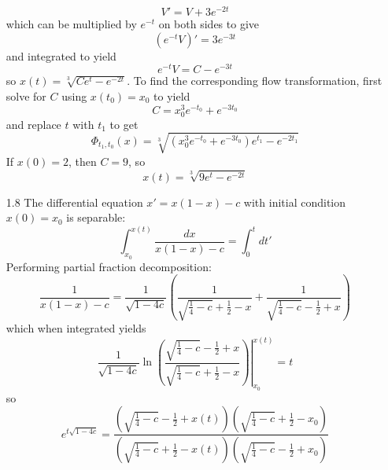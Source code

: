 \documentclass{exam}
\begin{document}
\begin{enumerate}
    \begin{equation*}
        V' = V + 3e^{-2t} 
    \end{equation*}
    which can be multiplied by $e^{-t}$ on both sides to give
    \begin{equation*}
        \left(e^{-t}V\right)' = 3e^{-3t}
    \end{equation*}
    and integrated to yield
    \begin{equation*}
        e^{-t}V = C-e^{-3t}
    \end{equation*}
    so $x(t) = \sqrt[3]{Ce^{t}-e^{-2t}}$. To find the corresponding flow transformation, first solve for $C$ using $x(t_0) = x_0$ to yield
    \begin{equation*}
        C = x_0^3e^{-t_0} + e^{-3t_0}
    \end{equation*}
    and replace $t$ with $t_1$ to get
    \begin{equation*}
        \Phi_{t_1, t_0}(x) = \sqrt[3]{\left(x_0^3e^{-t_0}+e^{-3t_0}\right)e^{t_1}-e^{-2t_1}}
    \end{equation*}
    If $x(0) = 2$, then $C = 9$, so
    \begin{equation*}
        x(t) = \sqrt[3]{9e^t-e^{-2t}}
    \end{equation*}
    \item[1.8] The differential equation $x' = x(1-x) - c$ with initial condition $x(0) = x_0$ is separable:
    \begin{equation*}
        \int_{x_0}^{x(t)}\frac{dx}{x(1-x)-c} = \int_{0}^{t}dt'
    \end{equation*}
    Performing partial fraction decomposition:
    \begin{equation*}
        \frac{1}{x(1-x)-c} = \frac{1}{\sqrt{1-4c}}\left(\frac{1}{\sqrt{\frac{1}{4}-c}+\frac{1}{2}-x}+\frac{1}{\sqrt{\frac{1}{4}-c}-\frac{1}{2}+x}\right)
    \end{equation*}
    which when integrated yields
    \begin{equation*}
        \left.\frac{1}{\sqrt{1-4c}}\ln\left(\frac{\sqrt{\frac{1}{4}-c}-\frac{1}{2}+x}{\sqrt{\frac{1}{4}-c}+\frac{1}{2}-x}\right)\right\vert_{x_0}^{x(t)} = t
    \end{equation*}
    so
    \begin{equation*}
        e^{t\sqrt{1-4c}}=\frac{\left(\sqrt{\frac{1}{4}-c}-\frac{1}{2}+x(t)\right)\left(\sqrt{\frac{1}{4}-c}+\frac{1}{2}-x_{0}\right)}{\left(\sqrt{\frac{1}{4}-c}+\frac{1}{2}-x(t)\right)\left(\sqrt{\frac{1}{4}-c}-\frac{1}{2}+x_{0}\right)}
    \end{equation*}

\end{enumerate}
\end{document}
